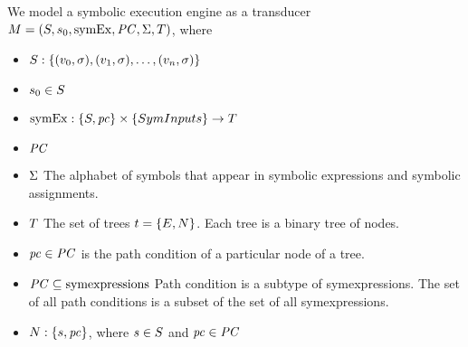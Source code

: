 We model a symbolic execution engine as a transducer $M =
(S, s_0, \mathrm{symEx}, \mathit{PC}, \Sigma,
T)$, where
\begin{itemize}
\item $S: \{(v_0,\sigma), (v_1,\sigma), \ldots, (v_n,\sigma)\}$
\item $s_0 \in S$
\item {} $\mathrm{symEx}: \{S,\mathit{pc}\}
  \times \{SymInputs\} \rightarrow T$
\item $\mathit{PC}$
\item $\Sigma$ The alphabet of symbols that appear in symbolic expressions
  and symbolic assignments.
\item $T$ The set of trees $t = \{E,N\}$. Each tree is a binary tree of nodes.
\end{itemize}

\begin{itemize}
\item $\mathit{pc} \in \mathit{PC}$ is the path condition of a particular node of a tree.
\item $\mathit{PC} \subseteq \mathrm{symexpressions}$ Path condition is a subtype of
  symexpressions. The set of all path conditions is a subset of the set of all
  symexpressions.
\item $N: \{s,\mathit{pc}\}$, where $s \in S$
  and $\mathit{pc} \in \mathit{PC}$
\end{itemize}



